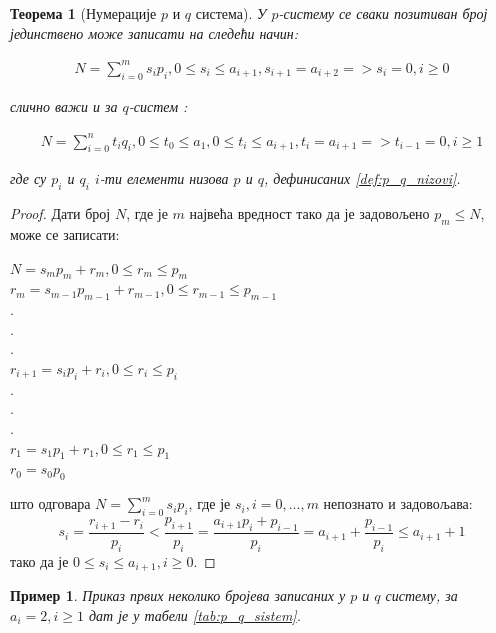 \documentclass[a4paper]{article}
\newtheorem{example}{Пример}
\newtheorem{theorem}{Теорема}
\begin{document}
\begin{theorem}[Нумерације $ p $ и $ q $ система]
	\label{thm:p_q_sistemi}
	У $ p $-систему се сваки позитиван број јединствено може записати на следећи начин:
	
	\begin{eqnarray}
		N = \sum_{i=0}^{m} s_{i}p_{i}, 0 \le s_{i} \le a_{i+1}, s_{i+1} = a_{i+2} => s_{i}=0 , i \ge 0
	\end{eqnarray}
	
	слично важи и за $ q $-систем :
	
	\begin{eqnarray}
		N = \sum_{i=0}^{n} t_{i}q_{i}, 0 \le t_{0} \le a_{1}, 0 \le t_{i} \le a_{i+1}, t_{i} = a_{i+1} => t_{i-1}=0 , i \ge 1
	\end{eqnarray}
	
	где су $ p_{i} $ и $ q_{i} $ $ i $-ти елементи низова $ p $ и $ q $, дефинисаних \ref{def:p_q_nizovi}.
\end{theorem} 

\begin{proof}
	Дати број $ N $, где је $ m $ највећа вредност тако да је задовољено $ p_{m} \leq N $, може се записати:
	\begin{center}
		$ N = s_{m}p_{m} + r_{m}, 0 \leq r_{m} \le p_{m} $\\
		$ r_{m} = s_{m-1}p_{m-1} + r_{m-1}, 0 \leq r_{m-1} \le p_{m-1} $\\
		$ . $\\
		$ . $\\
		$ . $\\
		$ r_{i+1} = s_{i}p_{i} + r_{i}, 0 \leq r_{i} \le p_{i} $\\
		$ . $\\
		$ . $\\
		$ . $\\
		$ r_{1} = s_{1}p_{1} + r_{1}, 0 \leq r_{1} \le p_{1} $\\
		$ r_{0} = s_{0}p_{0} $
	\end{center}
	што одговара $ N = \sum_{i=0}^{m} s_{i}p_{i} $, где је $ s_{i}, i={0, ..., m} $ непознато и задовољава:
	\begin{displaymath}
		s_{i} = \frac{r_{i+1} - r_{i}}{p_{i}} < \frac{p_{i+1}}{p_{i}} = \frac{a_{i+1}p_{i}+p_{i-1}}{p_{i}} = a_{i+1} + \frac{p_{i-1}}{p_{i}} \leq a_{i+1} + 1 
	\end{displaymath}  
	тако да је $ 0 \leq s_{i} \leq a_{i+1}, i \geq 0 $.
\end{proof}

\begin{example}
	Приказ првих неколико бројева записаних у $ p $ и $ q $ систему, за $ a_{i} = 2 , i \ge 1 $ дат је у табели \ref{tab:p_q_sistem}.
\end{example}
\end{document}
